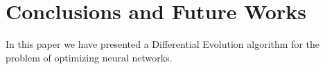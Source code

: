\section{Conclusions and Future Works}

In this paper we have presented a Differential Evolution algorithm for the problem of optimizing neural networks.
